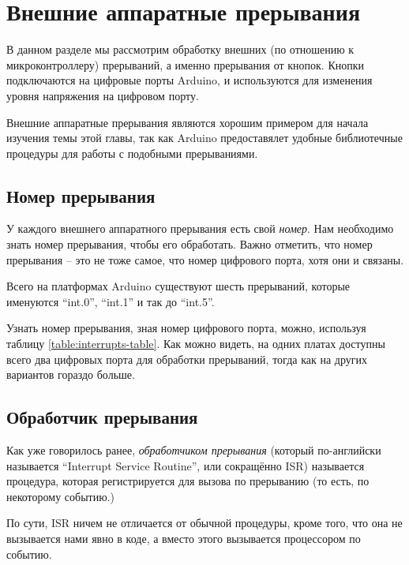 \documentclass[../sparc.tex]{subfiles}
\begin{document}
\section{Внешние аппаратные прерывания}

В данном разделе мы рассмотрим обработку внешних (по отношению к
микроконтроллеру) прерываний, а именно прерывания от кнопок.  Кнопки
подключаются на цифровые порты Arduino, и используются для изменения уровня
напряжения на цифровом порту.

Внешние аппаратные прерывания являются хорошим примером для начала изучения темы
этой главы, так как Arduino предоставялет удобные библиотечные процедуры для
работы с подобными прерываниями.

\subsection{Номер прерывания}

У каждого внешнего аппаратного прерывания есть свой \emph{номер}.  Нам
необходимо знать номер прерывания, чтобы его обработать.  Важно отметить, что
номер прерывания -- это не тоже самое, что номер цифрового порта, хотя они и
связаны.

Всего на платформах Arduino существуют шесть прерываний, которые именуются
``int.0'', ``int.1'' и так до ``int.5''.


Узнать номер прерывания, зная номер цифрового порта, можно, используя таблицу
\ref{table:interrupts-table}.  Как можно видеть, на одних платах доступны всего
два цифровых порта для обработки прерываний, тогда как на других вариантов
гораздо больше.

\subsection{Обработчик прерывания}

Как уже говорилось ранее, \emph{обработчиком прерывания} (который по-английски
называется ``Interrupt Service Routine'', или сокращённо \gls{ISR}) называется
процедура, которая регистрируется для вызова по прерыванию (то есть, по
некоторому событию.)

По сути, ISR ничем не отличается от обычной процедуры, кроме того, что она не
вызывается нами явно в коде, а вместо этого вызывается процессором по событию.
\end{document}
